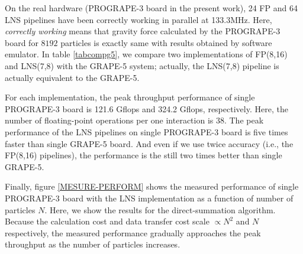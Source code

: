 \documentclass{llncs}
\begin{document}
On the real hardware (PROGRAPE-3 board in the present work), 
24 FP and 64 LNS pipelines have been correctly working in parallel at 133.3MHz.
Here, {\it correctly working} means that gravity force calculated by
the PROGRAPE-3 board for $8192$ particles is exactly same with results
obtained by software emulator.
In table \ref{tabcompg5}, we compare two implementations of FP(8,16) and LNS(7,8)
with the GRAPE-5 system\cite{KFMT00};
actually, the LNS(7,8) pipeline is actually equivalent to the GRAPE-5.

For each implementation, the peak throughput performance 
of single PROGRAPE-3 board is 121.6 Gflops and 324.2 Gflops, respectively.
Here, the number of floating-point operations per one interaction is 38.
The peak performance of the LNS pipelines on single PROGRAPE-3
board is five times faster than single GRAPE-5 board.
And even if we use twice accuracy (i.e., the FP(8,16) pipelines),
the performance is the still two times better than single GRAPE-5.

Finally, figure \ref{MESURE-PERFORM} shows the measured performance of
single PROGRAPE-3 board with the LNS implementation as a function of
number of particles $N$. Here, we show the results for the
direct-summation algorithm.  Because the calculation cost
and data transfer cost scale $\propto N^2$ and $N$ respectively, the
measured performance gradually approaches the peak throughput as the
number of particles increases.
\end{document}
